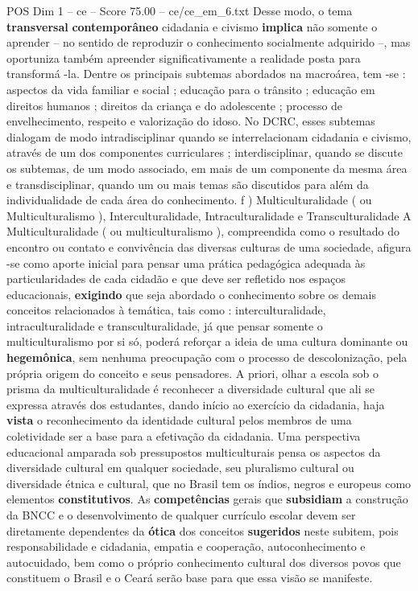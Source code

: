 \begin{textsample}{POS Dim 1 – ce – Score 75.00 – ce/ce\_em\_6.txt}
Desse modo, o tema \textbf{transversal} \textbf{contemporâneo} cidadania e civismo \textbf{implica} não somente o aprender – no sentido de reproduzir o conhecimento socialmente adquirido –, mas oportuniza também apreender significativamente a realidade posta para transformá -la.
Dentre os principais subtemas abordados na macroárea, tem -se : aspectos da vida familiar e social ; educação para o trânsito ; educação em direitos humanos ; direitos da criança e do adolescente ; processo de envelhecimento, respeito e valorização do idoso.
No DCRC, esses subtemas dialogam de modo intradisciplinar quando se interrelacionam cidadania e civismo, através de um dos componentes curriculares ; interdisciplinar, quando se discute os subtemas, de um modo associado, em mais de um componente da mesma área e transdisciplinar, quando um ou mais temas são discutidos para além da individualidade de cada área do conhecimento. f ) Multiculturalidade ( ou Multiculturalismo ), Interculturalidade, Intraculturalidade e Transculturalidade A Multiculturalidade ( ou multiculturalismo ), compreendida como o resultado do encontro ou contato e convivência das diversas culturas de uma sociedade, afigura -se como aporte inicial para pensar uma prática pedagógica adequada às particularidades de cada cidadão e que deve ser refletido nos espaços educacionais, \textbf{exigindo} que seja abordado o conhecimento sobre os demais conceitos relacionados à temática, tais como : interculturalidade, intraculturalidade e transculturalidade, já que pensar somente o multiculturalismo por si só, poderá reforçar a ideia de uma cultura dominante ou \textbf{hegemônica}, sem nenhuma preocupação com o processo de descolonização, pela própria origem do conceito e seus pensadores.
A priori, olhar a escola sob o prisma da multiculturalidade é reconhecer a diversidade cultural que ali se expressa através dos estudantes, dando início ao exercício da cidadania, haja \textbf{vista} o reconhecimento da identidade cultural pelos membros de uma coletividade ser a base para a efetivação da cidadania.
Uma perspectiva educacional amparada sob pressupostos multiculturais pensa os aspectos da diversidade cultural em qualquer sociedade, seu pluralismo cultural ou diversidade étnica e cultural, que no Brasil tem os índios, negros e europeus como elementos \textbf{constitutivos}.
As \textbf{competências} gerais que \textbf{subsidiam} a construção da BNCC e o desenvolvimento de qualquer currículo escolar devem ser diretamente dependentes da \textbf{ótica} dos conceitos \textbf{sugeridos} neste subitem, pois responsabilidade e cidadania, empatia e cooperação, autoconhecimento e autocuidado, bem como o próprio conhecimento cultural dos diversos povos que constituem o Brasil e o Ceará serão base para que essa visão se manifeste.

\end{textsample}
